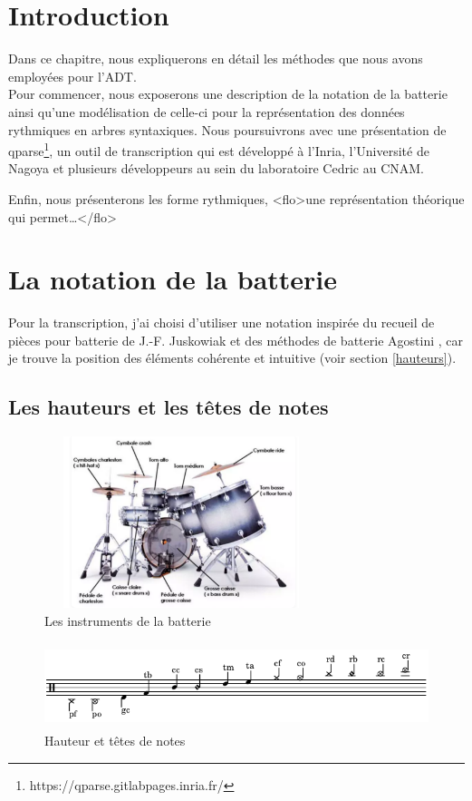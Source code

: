 \section*{Introduction}
Dans ce chapitre, nous expliquerons en détail les méthodes que nous avons
employées pour l’ADT.\\
Pour commencer, nous exposerons une description de la notation de la batterie
ainsi qu’une modélisation de celle-ci pour la représentation des données
rythmiques en arbres syntaxiques. Nous poursuivrons avec une présentation de
qparse\footnote{https://qparse.gitlabpages.inria.fr/}, un outil de
transcription qui est développé à l'Inria, l'Université de Nagoya et plusieurs
développeurs au sein du laboratoire Cedric au CNAM.

Enfin, nous présenterons les forme rythmiques, <flo>une représentation
théorique qui permet…</flo> 

\section{La notation de la batterie}
\label{notation_batterie}
Pour la transcription, j’ai choisi d’utiliser une notation inspirée du recueil
de pièces pour batterie de J.-F. Juskowiak \cite{jusko} et des méthodes de
batterie Agostini \cite{ago_meth_3}, car je trouve la position des éléments
cohérente et intuitive (voir section \ref{hauteurs}).\newpage

\subsection*{Les hauteurs et les têtes de notes}
\label{hauteurs}
\begin{figure}[h]
\centering
\includegraphics[height=50mm, width=80mm]{
z_images/3_methodes/0_notation_de_la_batterie/batterie.png}
\caption{Les instruments de la batterie}
\label{instru_batt}
\end{figure}

\begin{figure}[!h]
\centering
\includegraphics[height=25mm, width=130mm]{
z_images/3_methodes/0_notation_de_la_batterie/2_hauteurs_et_tete_de_notes.png}
\caption{Hauteur et têtes de notes}
\label{haut}
\end{figure}

